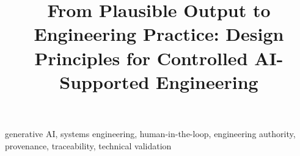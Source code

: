 \documentclass[conference]{IEEEtran}
\title{From Plausible Output to Engineering Practice:
Design Principles for Controlled AI-Supported Engineering}
\author{
\IEEEauthorblockN{Moritz Diez}
\IEEEauthorblockA{
Systems Engineering\\
Munich, Germany\\
}
}
\begin{document}
\maketitle

\begin{abstract}

\end{abstract}

\begin{IEEEkeywords}
generative AI, systems engineering, human-in-the-loop, engineering authority,
provenance, traceability, technical validation
\end{IEEEkeywords}










\end{document}
